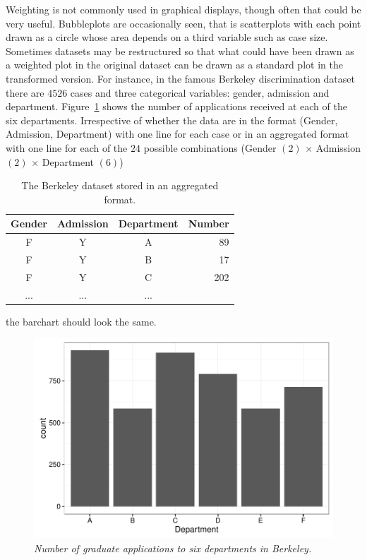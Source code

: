 \documentclass{svmult}
\begin{document}
Weighting is not commonly used in graphical displays, though often that could be very useful.  Bubbleplots are occasionally seen, that is scatterplots with each point drawn as a circle whose area depends on a third variable such as case size.  Sometimes datasets may be restructured so that what could have been drawn as a weighted plot in the original dataset can be drawn as a standard plot in the transformed version.  For instance, in the famous Berkeley discrimination dataset \citep{bickel:1975} there are $4526$ cases and three categorical variables: gender, admission and department.  Figure~\ref{berk} shows the number of applications received at each of the six departments. Irrespective of whether the data are in the format (Gender, Admission, Department) with one line for each case or in an aggregated format with one line for each of the $24$ possible combinations (Gender $(2)$ $\times$ Admission $(2)$ $\times$ Department $(6)$)
\begin{table}[h]
\begin{center}
\caption{The Berkeley dataset stored in an aggregated format.}
\begin{tabular}{|c|c|c|r|}
\hline
Gender & Admission & Department & Number\\
\hline
F & Y & A & 89\\
F & Y & B & 17\\
F & Y & C & 202\\
... &... &... &\\
\hline
\end{tabular}
\end{center}
\label{berktab}
\end{table}
the barchart should look the same.

\begin{figure}[htbp]
  \centering
  \includegraphics[width=0.8\linewidth]{berkeley}
  \caption{\em Number of graduate applications to six departments in Berkeley.}
  \label{berk}
\end{figure}
\end{document}
